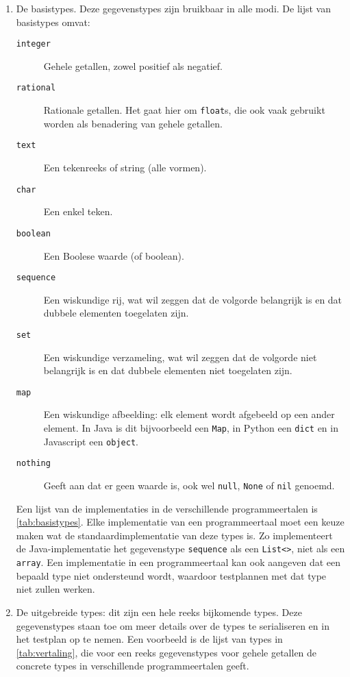 \begin{enumerate}
    \item De basistypes.
    Deze gegevenstypes zijn bruikbaar in alle modi.
    De lijst van basistypes omvat:
    \begin{description}
        \item[\texttt{integer}] Gehele getallen, zowel positief als negatief.
        \item[\texttt{rational}] Rationale getallen.
        Het gaat hier om \texttt{float}s, die ook vaak gebruikt worden als benadering van gehele getallen.
        \item[\texttt{text}] Een tekenreeks of string (alle vormen).
        \item[\texttt{char}] Een enkel teken.
        \item[\texttt{boolean}] Een Boolese waarde (of boolean).
        \item[\texttt{sequence}] Een wiskundige rij, wat wil zeggen dat de volgorde belangrijk is en dat dubbele elementen toegelaten zijn.
        \item[\texttt{set}] Een wiskundige verzameling, wat wil zeggen dat de volgorde niet belangrijk is en dat dubbele elementen niet toegelaten zijn.
        \item[\texttt{map}] Een wiskundige afbeelding: elk element wordt afgebeeld op een ander element.
        In Java is dit bijvoorbeeld een \texttt{Map}, in Python een \texttt{dict} en in Javascript een \texttt{object}.
        \item[\texttt{nothing}] Geeft aan dat er geen waarde is, ook wel \texttt{null}, \texttt{None} of \texttt{nil} genoemd.
    \end{description}
    Een lijst van de implementaties in de verschillende programmeertalen is \cref{tab:basistypes}.
    Elke implementatie van een programmeertaal moet een keuze maken wat de standaardimplementatie van deze types is.
    Zo implementeert de Java-implementatie het gegevenstype \texttt{sequence} als een \texttt{List<>}, niet als een \texttt{array}.
    Een implementatie in een programmeertaal kan ook aangeven dat een bepaald type niet ondersteund wordt, waardoor testplannen met dat type niet zullen werken.
    \item De uitgebreide types: dit zijn een hele reeks bijkomende types.
    Deze gegevenstypes staan toe om meer details over de types te serialiseren en in het testplan op te nemen.
    Een voorbeeld is de lijst van types in \cref{tab:vertaling}, die voor een reeks gegevenstypes voor gehele getallen de concrete types in verschillende programmeertalen geeft.

\end{enumerate}
